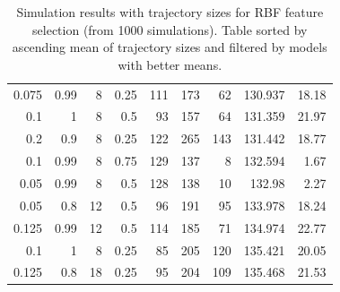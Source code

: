 \documentclass[10pt,twocolumn]{article}
\begin{document}
\begin{table}
\begin{tabular}{@{}rrrr|rrrrr@{}}
  0.075 & 0.99 & 8 & 0.25 & 111 & 173 & 62 & 130.937 & 18.18\\
  0.1 & 1 & 8 & 0.5 & 93 & 157 & 64 & 131.359 & 21.97\\
  0.2 & 0.9 & 8 & 0.25 & 122 & 265 & 143 & 131.442 & 18.77\\
  0.1 & 0.99 & 8 & 0.75 & 129 & 137 & 8 & 132.594 & 1.67\\
  0.05 & 0.99 & 8 & 0.5 & 128 & 138 & 10 & 132.98 & 2.27\\
  0.05 & 0.8 & 12 & 0.5 & 96 & 191 & 95 & 133.978 & 18.24\\
  0.125 & 0.99 & 12 & 0.5 & 114 & 185 & 71 & 134.974 & 22.77\\
  0.1 & 1 & 8 & 0.25 & 85 & 205 & 120 & 135.421 & 20.05\\
  0.125 & 0.8 & 18 & 0.25 & 95 & 204 & 109 & 135.468 & 21.53\\
  \bottomrule
  \end{tabular}
  \caption{Simulation results with trajectory sizes for RBF feature selection (from 1000 simulations). Table sorted by ascending mean of trajectory sizes and filtered by models with better means.}
  \label{rbf-simulation-result}
\end{table}
\end{document}
